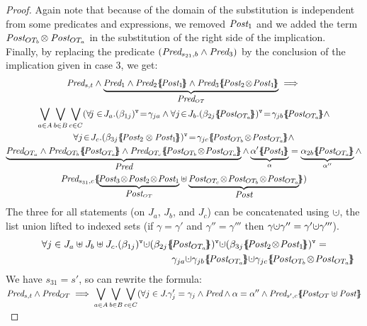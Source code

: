 \documentclass{lmcs}
\newcommand{\shortotimes}{\!\otimes\!}
\begin{document}
\begin{proof}
Again note that because of the domain  of the substitution is independent from some predicates and expressions, we removed $\Post_1$ and  we  added the term $\Post_{OT_{b}}\shortotimes\,\Post_{OT_a}$ in the substitution of the right side of the implication.\\
Finally, by replacing the predicate $(\Pred_{s_{21},b} \land  \Pred_3)$
by the conclusion of the  implication given in case 3, we get:
\begin{multline*}\Pred_{s,t} \land \underbrace{\Pred_1\land \Pred_2\subst{\Post_1} \land \Pred_3\subst{\Post_2\shortotimes\Post_1}}_{\Pred_{OT}}\implies\\
 {\bigvee_{a\in A}}\, {\bigvee_{b\in B}}\, {\bigvee_{c\in C}} 
(\forall\! j\in\! J_a.\vis{\beta_{1j}}\!=\!\gamma_{ja} \land  \forall j \!\in\! J_{b}.\vis{\beta_{2j}\subst{\Post_{OT_a}}}\!=\!\gamma_{jb} \subst{\Post_{OT_a}}  \land \\
 \forall j\!\in\! J_{c}. \vis{\beta_{3j} \subst{\Post_2\,\shortotimes\,\Post_1}} \!=\!\gamma_{jc} \subst{\Post_{OT_{b}}\shortotimes\Post_{OT_a}}  \land\\
   \underbrace{\Pred_{OT_a}\land\Pred_{OT_{b}} \subst{\Post_{OT_a}} \land 
  \Pred_{OT_{c}}\subst{\Post_{OT_{b}}\shortotimes\Post_{OT_a}}}_{\Pred} \land  \underbrace{\alpha'\subst{\Post_1}}_{\alpha}=\underbrace{\alpha_{2 b} \subst{\Post_{OT_a}}}_{\alpha''} \land\\ \Pred_{s_{31},c}  \subst{\underbrace{\Post_3\shortotimes\Post_2\shortotimes\Post_1}_{\Post_{OT}}\uplus \underbrace{\Post_{OT_{c}}\shortotimes \Post_{OT_{b}}\shortotimes\Post_{OT_a}}_{\Post}})
\end{multline*}
The three for all statements (on $J_a$, $J_b$, and $J_c$) can be concatenated using $\dotcup$, the list union lifted to indexed sets (if $\gamma=\gamma'$ and $\gamma''=\gamma'''$ then $\gamma\dotcup\gamma''=\gamma'\dotcup\gamma'''$).
\begin{multline*}\forall j\in J_a\uplus J_b\uplus J_c.  \vis{\beta_{1j}}\dotcup \vis{\beta_{2j}\subst{\Post_{OT_a}}}\dotcup \vis{\beta_{3j} \subst{\Post_2\shortotimes\Post_1}}=\\ ~\hspace{5.5cm} \gamma_{j a} \dotcup \gamma_{jb} \subst{\Post_{OT_a}}  \dotcup \gamma_{jc} \subst{\Post_{OT_{b}}\shortotimes\Post_{OT_a}}
\end{multline*}
We have  $s_{31}=s'$, so can rewrite the formula:\\
$\Pred_{s,t} \land \Pred_{OT}\implies
\displaystyle{\bigvee_{a\in A}}\, \displaystyle{\bigvee_{b\in B}}\, \displaystyle{\bigvee_{c\in C}} 
(\forall j\in J.\gamma_j'=\gamma_j \land  \Pred \land \alpha=\alpha''  \land \Pred_{s',c}\subst{\Post_{OT}\uplus\Post\,}$\\


\end{proof}
\end{document}
